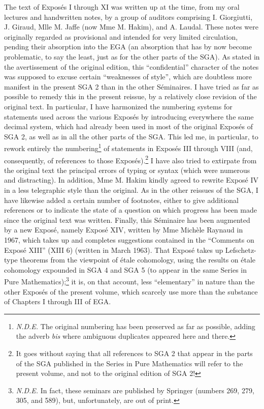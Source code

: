 \documentclass[
]{article}
\begin{document}
The text of Exposés I through XI was written up at the time, from my
oral lectures and handwritten notes, by a group of auditors comprising
I. Giorgiutti, J. Giraud, Mlle M. Jaffe (now Mme M. Hakim), and A.
Laudal. These notes were originally regarded as provisional and intended
for very limited circulation, pending their absorption into the EGA (an
absorption that has by now become problematic, to say the least, just as
for the other parts of the SGA). As stated in the avertissement of the
original edition, this ``confidential'' character of the notes was
supposed to excuse certain ``weaknesses of style'', which are doubtless
more manifest in the present SGA 2 than in the other Séminaires. I have
tried as far as possible to remedy this in the present reissue, by a
relatively close revision of the original text. In particular, I have
harmonized the numbering systems for statements used across the various
Exposés by introducing everywhere the same decimal system, which had
already been used in most of the original Exposés of SGA 2, as well as
in all the other parts of the SGA. This led me, in particular, to rework
entirely the numbering\footnote{\emph{N.D.E.} The original numbering has
  been preserved as far as possible, adding the adverb \emph{bis} where
  ambiguous duplicates appeared here and there.} of statements in
Exposés III through VIII (and, consequently, of references to those
Exposés).\footnote{It goes without saying that all references to SGA 2
  that appear in the parts of the SGA published in the Series in Pure
  Mathematics will refer to the present volume, and not to the original
  edition of SGA 2!} I have also tried to extirpate from the original
text the principal errors of typing or syntax (which were numerous and
distracting). In addition, Mme M. Hakim kindly agreed to rewrite Exposé
IV in a less telegraphic style than the original. As in the other
reissues of the SGA, I have likewise added a certain number of
footnotes, either to give additional references or to indicate the state
of a question on which progress has been made since the original text
was written. Finally, this Séminaire has been augmented by a new Exposé,
namely Exposé XIV, written by Mme Michèle Raynaud in 1967, which takes
up and completes suggestions contained in the ``Comments on Exposé
XIII'' (XIII 6) (written in March 1963). That Exposé takes up
Lefschetz-type theorems from the viewpoint of étale cohomology, using
the results on étale cohomology expounded in SGA 4 and SGA 5 (to appear
in the same Series in Pure Mathematics);\footnote{\emph{N.D.E.} In fact,
  these seminars are published by Springer (numbers 269, 279, 305, and
  589), but, unfortunately, are out of print.} it is, on that account,
less ``elementary'' in nature than the other Exposés of the present
volume, which scarcely use more than the substance of Chapters I through
III of EGA.
\end{document}
